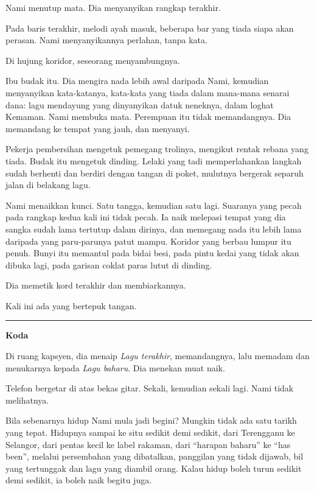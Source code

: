 \documentclass[
  11pt,
  a5paper,
  openany,
  oneside]{book}
\begin{document}
Nami menutup mata. Dia menyanyikan rangkap terakhir.

Pada baris terakhir, melodi ayah masuk, beberapa bar yang tiada siapa
akan perasan. Nami menyanyikannya perlahan, tanpa kata.

Di hujung koridor, seseorang menyambungnya.

Ibu budak itu. Dia mengira nada lebih awal daripada Nami, kemudian
menyanyikan kata-katanya, kata-kata yang tiada dalam mana-mana senarai
dana: lagu mendayung yang dinyanyikan datuk neneknya, dalam loghat
Kemaman. Nami membuka mata. Perempuan itu tidak memandangnya. Dia
memandang ke tempat yang jauh, dan menyanyi.

Pekerja pembersihan mengetuk pemegang trolinya, mengikut rentak rebana
yang tiada. Budak itu mengetuk dinding. Lelaki yang tadi memperlahankan
langkah sudah berhenti dan berdiri dengan tangan di poket, mulutnya
bergerak separuh jalan di belakang lagu.

Nami menaikkan kunci. Satu tangga, kemudian satu lagi. Suaranya yang
pecah pada rangkap kedua kali ini tidak pecah. Ia naik melepasi tempat
yang dia sangka sudah lama tertutup dalam dirinya, dan memegang nada itu
lebih lama daripada yang paru-parunya patut mampu. Koridor yang berbau
lumpur itu penuh. Bunyi itu memantul pada bidai besi, pada pintu kedai
yang tidak akan dibuka lagi, pada garisan coklat paras lutut di dinding.

Dia memetik kord terakhir dan membiarkannya.

Kali ini ada yang bertepuk tangan.

\begin{center}\rule{0.5\linewidth}{0.5pt}\end{center}

\textbf{Koda}

Di ruang kapsyen, dia menaip \emph{Lagu terakhir}, memandangnya, lalu
memadam dan menukarnya kepada \emph{Lagu baharu}. Dia menekan muat naik.

Telefon bergetar di atas bekas gitar. Sekali, kemudian sekali lagi. Nami
tidak melihatnya.

Bila sebenarnya hidup Nami mula jadi begini? Mungkin tidak ada satu
tarikh yang tepat. Hidupnya sampai ke situ sedikit demi sedikit, dari
Terengganu ke Selangor, dari pentas kecil ke label rakaman, dari
``harapan baharu'' ke ``has been'', melalui persembahan yang dibatalkan,
panggilan yang tidak dijawab, bil yang tertunggak dan lagu yang diambil
orang. Kalau hidup boleh turun sedikit demi sedikit, ia boleh naik
begitu juga.
\end{document}
